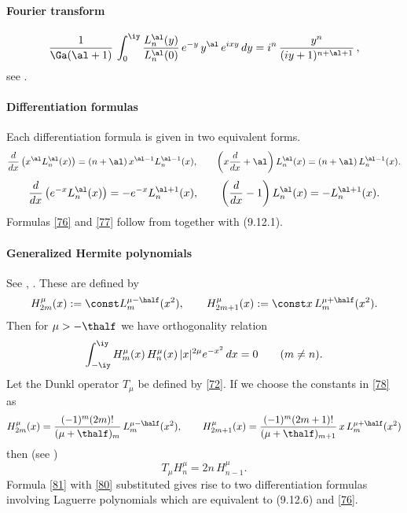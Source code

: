 \documentclass[envcountchap,graybox]{svmono}
\newcounter{rom}
\begin{document}
\paragraph{Fourier transform}
\begin{equation}
\frac1{\Ga(\al+1)}\,\int_0^\iy \frac{L_n^\al(y)}{L_n^\al(0)}\,
e^{-y}\,y^\al\,e^{ixy}\,dy=
i^n\,\frac{y^n}{(iy+1)^{n+\al+1}}\,,
\label{14}
\end{equation}
see .
%
\paragraph{Differentiation formulas}
Each differentiation formula is given in two equivalent forms.
\begin{equation}
\frac d{dx}\left(x^\al L_n^\al(x)\right)=
(n+\al)\,x^{\al-1} L_n^{\al-1}(x),\qquad
\left(x\frac d{dx}+\al\right)L_n^\al(x)=
(n+\al)\,L_n^{\al-1}(x).
\label{76}
\end{equation}
%
\begin{equation}
\frac d{dx}\left(e^{-x} L_n^\al(x)\right)=
-e^{-x} L_n^{\al+1}(x),\qquad
\left(\frac d{dx}-1\right)L_n^\al(x)=
-L_n^{\al+1}(x).
\label{77}
\end{equation}
%
Formulas \eqref{76} and \eqref{77} follow from
together with (9.12.1). 
%
\paragraph{Generalized Hermite polynomials}
See , \cite[Section 1.5.1]{K26}.
These are defined by
\begin{equation}
H_{2m}^\mu(x):=\const L_m^{\mu-\half}(x^2),\qquad
H_{2m+1}^\mu(x):=\const x\,L_m^{\mu+\half}(x^2).
\label{78}
\end{equation}
Then for $\mu>-\thalf$ we have orthogonality relation
\begin{equation}
\int_{-\iy}^{\iy} H_m^\mu(x)\,H_n^\mu(x)\,|x|^{2\mu}e^{-x^2}\,dx
=0\qquad(m\ne n).
\label{79}
\end{equation}
Let the Dunkl operator $T_\mu$ be defined by \eqref{72}.
If we choose the constants in \eqref{78} as
\begin{equation}
H_{2m}^\mu(x)=\frac{(-1)^m(2m)!}{(\mu+\thalf)_m}\,L_m^{\mu-\half}(x^2),\qquad
H_{2m+1}^\mu(x)=\frac{(-1)^m(2m+1)!}{(\mu+\thalf)_{m+1}}\,
 x\,L_m^{\mu+\half}(x^2)
 \label{80}
\end{equation}
then (see \cite[(1.6)]{K5})
\begin{equation}
T_\mu H_n^\mu=2n\,H_{n-1}^\mu.
\label{81}
\end{equation}
Formula \eqref{81} with \eqref{80} substituted gives rise to two
differentiation formulas involving Laguerre polynomials which are equivalent to
(9.12.6) and \eqref{76}.
\end{document}
